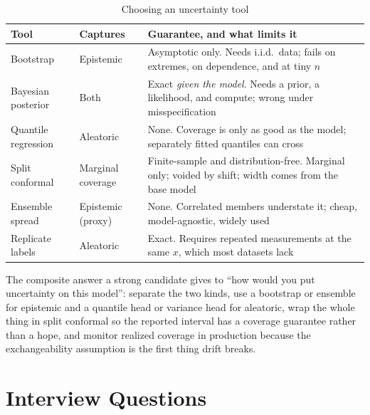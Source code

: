 \begin{table}[H]
\centering
\small
\caption{Choosing an uncertainty tool}
\label{cml:tab:uncertainty_tools}
\begin{tabularx}{\textwidth}{llX}
\toprule
\textbf{Tool} & \textbf{Captures} & \textbf{Guarantee, and what limits it} \\
\midrule
Bootstrap & Epistemic & Asymptotic only. Needs i.i.d.\ data; fails on extremes, on dependence, and at tiny $n$ \\
Bayesian posterior & Both & Exact \textit{given the model}. Needs a prior, a likelihood, and compute; wrong under misspecification \\
Quantile regression & Aleatoric & None. Coverage is only as good as the model; separately fitted quantiles can cross \\
Split conformal & Marginal coverage & Finite-sample and distribution-free. Marginal only; voided by shift; width comes from the base model \\
Ensemble spread & Epistemic (proxy) & None. Correlated members understate it; cheap, model-agnostic, widely used \\
Replicate labels & Aleatoric & Exact. Requires repeated measurements at the same $x$, which most datasets lack \\
\bottomrule
\end{tabularx}
\end{table}

The composite answer a strong candidate gives to ``how would you put uncertainty on this model'': separate the two kinds, use a bootstrap or ensemble for epistemic and a quantile head or variance head for aleatoric, wrap the whole thing in split conformal so the reported interval has a coverage guarantee rather than a hope, and monitor realized coverage in production because the exchangeability assumption is the first thing drift breaks.

\section{Interview Questions}
\label{cml:sec:probabilistic_interview}

